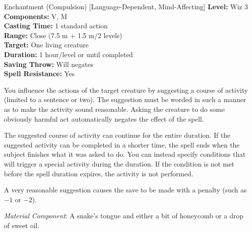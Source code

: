 {Enchantment (Compulsion) [Language-Dependent, Mind-Affecting]}
{
	\textbf{Level:}
	Wiz 3\\
	\textbf{Components:}
	V, M\\
	\textbf{Casting Time:}
	1 standard action\\
	\textbf{Range:}
	Close (7.5 m + 1.5 m/2 levels)\\
	\textbf{Target:}
	One living creature\\
	\textbf{Duration:}
	1 hour/level or until completed\\
	\textbf{Saving Throw:}
	Will negates\\
	\textbf{Spell Resistance:}
	Yes\\
}
{
	You influence the actions of the target creature by suggesting a course of activity (limited to a sentence or two). The suggestion must be worded in such a manner as to make the activity sound reasonable. Asking the creature to do some obviously harmful act automatically negates the effect of the spell.

	The suggested course of activity can continue for the entire duration. If the suggested activity can be completed in a shorter time, the spell ends when the subject finishes what it was asked to do. You can instead specify conditions that will trigger a special activity during the duration. If the condition is not met before the spell duration expires, the activity is not performed.

	A very reasonable suggestion causes the save to be made with a penalty (such as $-1$ or $-2$).

	\textit{Material Component}:
	A snake's tongue and either a bit of honeycomb or a drop of sweet oil.

}
